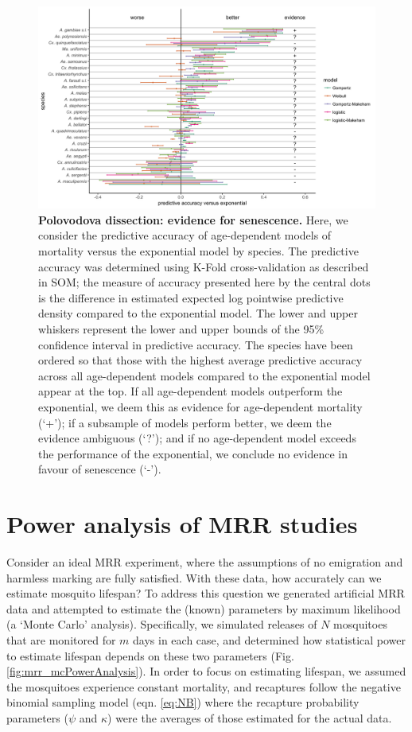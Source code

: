 \documentclass[12pt]{article}
\begin{document}
\begin{figure}[ht]
	\centerline{\includegraphics[width=1.25\textwidth]{./Figure_files/elpd_vs_exponential_ordered_dissection.png}}
	\caption{\textbf{Polovodova dissection: evidence for senescence.}  Here, we consider the predictive accuracy of age-dependent models of mortality versus the exponential model by species. The predictive accuracy was determined using K-Fold cross-validation as described in SOM; the measure of accuracy presented here by the central dots is the difference in estimated expected log pointwise predictive density compared to the exponential model. The lower and upper whiskers represent the lower and upper bounds of the 95\% confidence interval in predictive accuracy. The species have been ordered so that those with the highest average predictive accuracy across all age-dependent models compared to the exponential model appear at the top. If all age-dependent models outperform the exponential, we deem this as evidence for age-dependent mortality (`+'); if a subsample of models perform better, we deem the evidence ambiguous (`?'); and if no age-dependent model exceeds the performance of the exponential, we conclude no evidence in favour of senescence (`-').}
	\label{fig:dissection_senescence}
\end{figure}


\section{Power analysis of MRR studies}
Consider an ideal MRR experiment, where the assumptions of no emigration and harmless marking are fully satisfied. With these data, how accurately can we estimate mosquito lifespan? To address this question we generated artificial MRR data and attempted to estimate the (known) parameters by maximum likelihood (a `Monte Carlo' analysis). Specifically, we simulated releases of $N$ mosquitoes that are monitored for $m$ days in each case, and determined how statistical power to estimate lifespan depends on these two parameters (Fig. \ref{fig:mrr_mcPowerAnalysis}). In order to focus on estimating lifespan, we assumed the mosquitoes experience constant mortality, and recaptures follow the negative binomial sampling model (eqn. \ref{eq:NB}) where the recapture probability parameters ($\psi$ and $\kappa$) were the averages of those estimated for the actual data.
\end{document}
